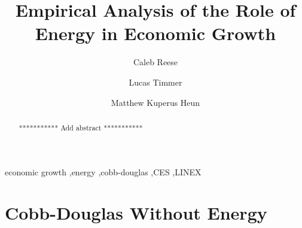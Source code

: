 \documentclass[preprint,authoryear,12pt]{elsarticle}\usepackage{graphicx, color}
\begin{document}
\begin{frontmatter}



\title{Empirical Analysis of the Role of Energy in Economic Growth}


\author[Calvin]{Caleb Reese}
\author[Calvin]{Lucas Timmer}
\author[Calvin]{Matthew Kuperus Heun }

\address[Calvin]{Engineering Department, Calvin College, Grand Rapids, MI 49546, USA}

\begin{abstract}
*********** Add abstract ***********
\end{abstract}

\begin{keyword}
economic growth \sep energy \sep cobb-douglas \sep CES \sep LINEX
\end{keyword}

\end{frontmatter}









\section{Cobb-Douglas Without Energy}
\end{document}
